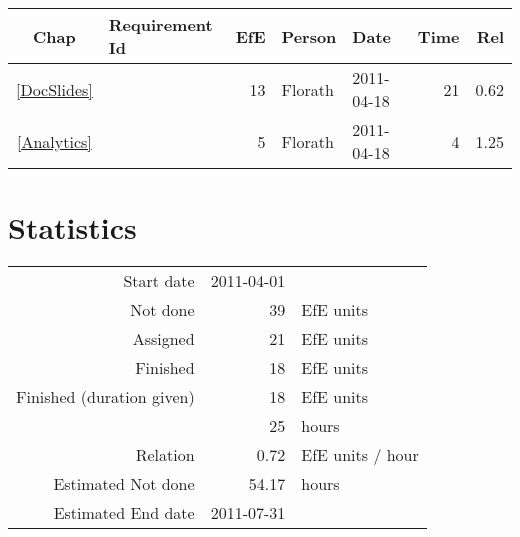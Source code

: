 {\small \begin{longtable}{|c|p{5.5cm}||r|l|l|r|r|} \hline
\textbf{Chap} & \textbf{Requirement Id} & \textbf{EfE} & \textbf{Person} & \textbf{Date} & \textbf{Time} & \textbf{Rel} \\ \hline\endhead
\ref{DocSlides} & \nameref{DocSlides} & 13 & Florath & 2011-04-18 & 21 & 0.62 \\ \hline
\ref{Analytics} & \nameref{Analytics} & 5 & Florath & 2011-04-18 & 4 & 1.25 \\ \hline
\end{longtable}}\section{Statistics}
\begin{longtable}{rrl}
Start date & 2011-04-01 & \\ 
Not done & 39 & EfE units \\ 
Assigned & 21 & EfE units \\ 
Finished & 18 & EfE units \\ 
Finished (duration given) & 18 & EfE units \\ 
 & 25 & hours \\ 
Relation & 0.72 & EfE units / hour \\ 
Estimated Not done & 54.17 & hours \\ 
Estimated End date & 2011-07-31 & \\ 
\end{longtable}